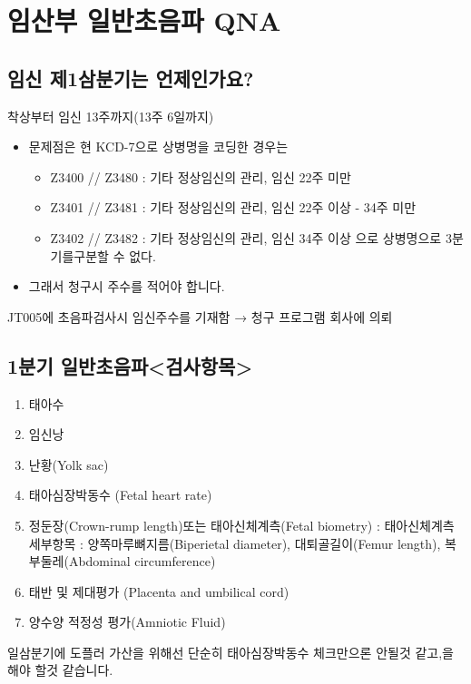 \section{임산부 일반초음파 QNA}
\subsection{임신 제1삼분기는 언제인가요?}
착상부터 임신 13주까지(13주 6일까지)
\begin{itemize}\tightlist
\item 문제점은 현 KCD-7으로 상병명을 코딩한 경우는 
	\begin{itemize}\tightlist
	\item Z3400 // Z3480 : 기타 정상임신의 관리, 임신 22주 미만
	\item Z3401 // Z3481 : 기타 정상임신의 관리, 임신 22주 이상 - 34주 미만
	\item Z3402 // Z3482 : 기타 정상임신의 관리, 임신 34주 이상 으로 상병명으로 3분기를구분할 수 없다.
	\end{itemize}
\item 그래서 청구시 주수를 적어야 합니다.
\end{itemize}
JT005에 초음파검사시 임신주수를 기재함 → 청구 프로그램 회사에 의뢰
\par
\medskip
{}
\prezi{\clearpage}
\subsection{1분기 일반초음파<검사항목>}
\begin{enumerate}[①]\tightlist
\item 태아수 
\item 임신낭
\item 난황(Yolk sac)
\item 태아심장박동수 (Fetal heart rate)
\item 정둔장(Crown-rump length)또는 태아신체계측(Fetal biometry) : 태아신체계측 세부항목 : 양쪽마루뼈지름(Biperietal diameter), 대퇴골길이(Femur length), 복부둘레(Abdominal circumference)
\item 태반 및 제대평가 (Placenta and umbilical cord)
\item 양수양 적정성 평가(Amniotic Fluid)
\end{enumerate}
\begin{quotebox}
일삼분기에 도플러 가산을 위해선 단순히 태아심장박동수 체크만으론 안될것 같고,을 해야 할것 같습니다.
\end{quotebox}
\prezi{\clearpage}
